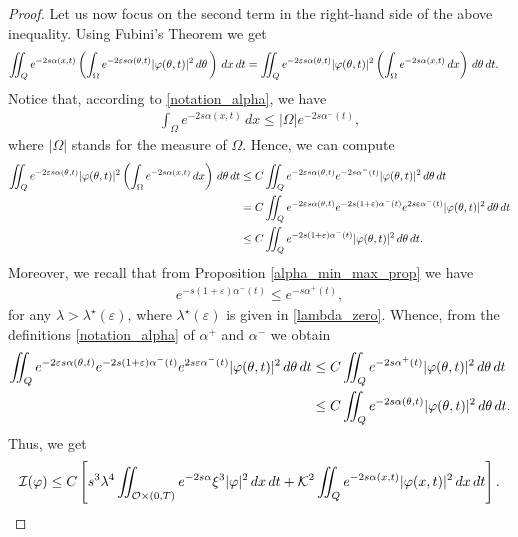 \documentclass{amsart}    %
\newcommand{\intd}{\displaystyle\int \kern -7pt \int}
\begin{document}
\begin{proof}
Let us now focus on the second term in the right-hand side of the above inequality. Using Fubini's Theorem we get
\begin{align*}
	\intd_Q e^{-2s\alpha(x,t)} & \left(\int_{\Omega} e^{-2\varepsilon s\alpha(\theta,t)}|\varphi(\theta,t)|^2\,d\theta\,\right)\,dx\,dt = \intd_Q e^{-2\varepsilon s\alpha(\theta,t)}|\varphi(\theta,t)|^2\left(\int_\Omega e^{-2s\alpha(x,t)}\,dx\right)\,d\theta\,dt.
\end{align*}
Notice that, according to \eqref{notation_alpha}, we have
\begin{align*}
	\int_\Omega e^{-2s\alpha(x,t)}\,dx \leq |\Omega| e^{-2s\alpha^-(t)},
\end{align*}
where $|\Omega|$ stands for the measure of $\Omega$. Hence, we can compute
\begin{align*}
	\intd_Q e^{-2\varepsilon s\alpha(\theta,t)}|\varphi(\theta,t)|^2\left(\int_\Omega e^{-2s\alpha(x,t)}\,dx\right)\,d\theta\,dt & \leq C \intd_Q e^{-2\varepsilon s\alpha(\theta,t)}e^{-2s\alpha^-(t)}|\varphi(\theta,t)|^2\,d\theta\,dt
	\\
	& = C \intd_Q e^{-2\varepsilon s\alpha(\theta,t)}e^{-2s(1+\varepsilon)\alpha^-(t)}e^{2s\varepsilon\alpha^-(t)}|\varphi(\theta,t)|^2\,d\theta\,dt
	\\
	& \leq C \intd_Q e^{-2s(1+\varepsilon)\alpha^-(t)}|\varphi(\theta,t)|^2\,d\theta\,dt.
\end{align*}	
Moreover, we recall that from Proposition \ref{alpha_min_max_prop} we have 
\begin{align*}
	e^{-s(1+\varepsilon)\alpha^-(t)}\leq e^{-s\alpha^+(t)},
\end{align*}
for any $\lambda >\lambda^\star(\varepsilon)$, where $\lambda^\star(\varepsilon)$ is given in \eqref{lambda_zero}. Whence, from the definitions \eqref{notation_alpha} of $\alpha^+$ and $\alpha^-$ we obtain
\begin{align*}
	\intd_Q e^{-2\varepsilon s\alpha(\theta,t)} e^{-2s(1+\varepsilon)\alpha^-(t)}  e^{2s\varepsilon\alpha^-(t)}|\varphi(\theta,t)|^2\,d\theta\,dt & \leq C \intd_Q e^{-2s\alpha^+(t)}|\varphi(\theta,t)|^2\,d\theta\,dt
	\\
	& \leq C \intd_Q e^{-2s\alpha(\theta,t)}|\varphi(\theta,t)|^2\,d\theta\,dt.
\end{align*}
Thus, we get
\begin{align*}
	\mathcal{I}(\varphi) \leq C \left[s^3\lambda^4\intd_{\mathcal O\times(0,T)} e^{-2s\alpha}\xi^3 |\varphi|^2\,dx\,dt + \mathcal{K}^2\intd_Q e^{-2s\alpha(x,t)}|\varphi(x,t)|^2\,dx\,dt\right].

\end{align*}
\end{proof}
\end{document}
